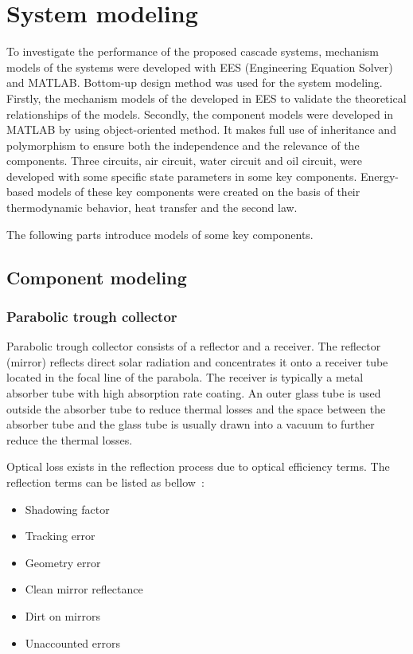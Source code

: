 \chapter{System modeling}

To investigate the performance of the proposed cascade systems, mechanism models of the systems were developed with EES (Engineering Equation Solver) and MATLAB. Bottom-up design method was used for the system modeling. Firstly, the mechanism models of the developed in EES to validate the theoretical relationships of the models. Secondly, the component models were developed in MATLAB by using object-oriented method. It makes full use of inheritance and polymorphism to ensure both the independence and the relevance of the components.
Three circuits, air circuit, water circuit and oil circuit, were developed with some specific state parameters in some key components. Energy-based models of these key components were created on the basis of their thermodynamic behavior, heat transfer and the second law.

The following parts introduce models of some key components.
\section{Component modeling}
\subsection{Parabolic trough collector}


Parabolic trough collector consists of a reflector and a receiver. The reflector (mirror) reflects direct solar radiation and concentrates it onto a receiver tube located in the focal line of the parabola. The receiver is typically a metal absorber tube with high absorption rate coating. An outer glass tube is used outside the absorber tube to reduce thermal losses and the space between the absorber tube and the glass tube is usually drawn into a vacuum to further reduce the thermal losses.

Optical loss exists in the reflection process due to optical efficiency terms. The reflection terms can be listed as bellow~\cite{Price2002}:

\begin{itemize}
  \item Shadowing factor
  \item Tracking error
  \item Geometry error
  \item Clean mirror reflectance
  \item Dirt on mirrors
  \item Unaccounted errors
\end{itemize}

